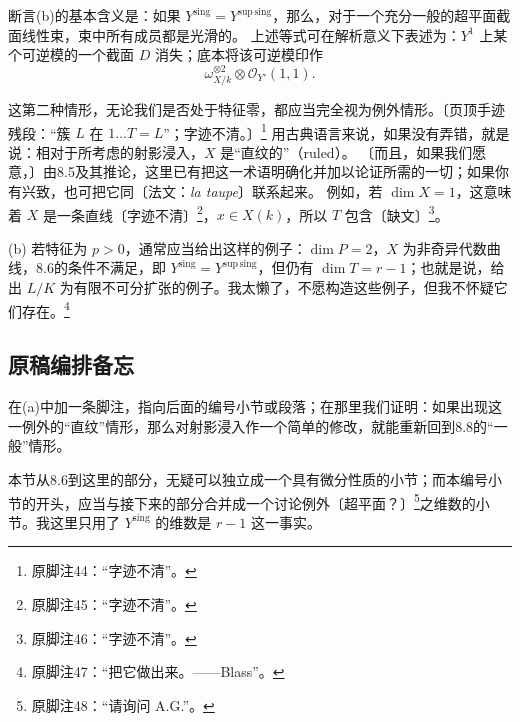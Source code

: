 断言(b)的基本含义是：如果 ${Y^{\mathrm{sing}}}={Y^{\mathrm{sup\,sing}}}$，那么，对于一个充分一般的超平面截面线性束，束中所有成员都是光滑的。
上述等式可在解析意义下表述为：$Y^1$ 上某个可逆模的一个截面 $D$ 消失；底本将该可逆模印作
\[
\omega_{X/k}^{\otimes2}\otimes\mathcal O_{Y'}(1,1).
\]


这第二种情形，无论我们是否处于特征零，都应当完全视为例外情形。〔页顶手迹残段：“簇 $L$ 在 $1\ldots T=L$”；字迹不清。〕\footnote{原脚注44：“字迹不清”。}
用古典语言来说，如果没有弄错，就是说：相对于所考虑的射影浸入，$X$ 是“直纹的”（ruled）。
〔而且，如果我们愿意，〕由8.5及其推论，这里已有把这一术语明确化并加以论证所需的一切；如果你有兴致，也可把它同〔法文：\emph{la taupe}〕联系起来。
例如，若 $\dim X=1$，这意味着 $X$ 是一条直线〔字迹不清〕\footnote{原脚注45：“字迹不清”。}，$x\in X(k)$，所以 $T$ 包含〔缺文〕\footnote{原脚注46：“字迹不清”。}。

(b) 若特征为 $p>0$，通常应当给出这样的例子：$\dim P=2$，$X$ 为非奇异代数曲线，8.6的条件不满足，即 ${Y^{\mathrm{sing}}}={Y^{\mathrm{sup\,sing}}}$，但仍有 $\dim T=r-1$；也就是说，给出 $L/K$ 为有限不可分扩张的例子。我太懒了，不愿构造这些例子，但我不怀疑它们存在。\footnote{原脚注47：“把它做出来。——Blass”。}

\subsection*{原稿编排备忘}
在(a)中加一条脚注，指向后面的编号小节或段落；在那里我们证明：如果出现这一例外的“直纹”情形，那么对射影浸入作一个简单的修改，就能重新回到8.8的“一般”情形。

本节从8.6到这里的部分，无疑可以独立成一个具有微分性质的小节；而本编号小节的开头，应当与接下来的部分合并成一个讨论例外〔超平面？〕\footnote{原脚注48：“请询问 A.G.”。}之维数的小节。我这里只用了 ${Y^{\mathrm{sing}}}$ 的维数是 $r-1$ 这一事实。


